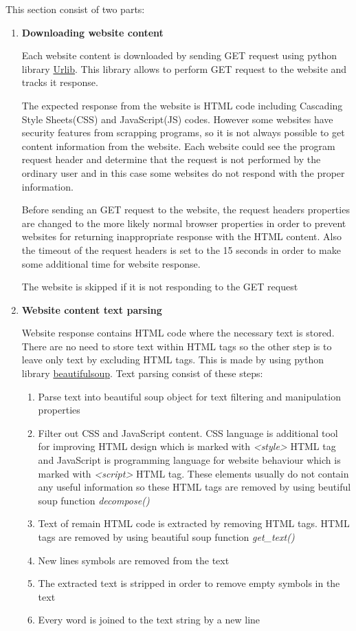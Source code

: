 This section consist of two parts:
\begin{enumerate}
    \item \textbf{Downloading website content}
    
    Each website content is downloaded by sending GET request using python library \href{https://docs.python.org/3/library/urllib.html}{Urlib}. This library allows to perform GET request to the website and tracks it response.
    
    The expected response from the website is HTML code including Cascading Style Sheets(CSS) and JavaScript(JS) codes. However some websites have security features from scrapping programs, so it is not always possible to get content information from the website. Each website could see the program request header and determine that the request is not performed by the ordinary user and in this case some websites do not respond with the proper information.
    
    Before sending an GET request to the website, the request headers properties are changed to the more likely normal browser properties in order to prevent websites for returning inappropriate response with the HTML content. Also the timeout of the request headers is set to the 15 seconds in order to make some additional time for website response. 
    
    The website is skipped if it is not responding to the GET request
    
    \item \textbf{Website content text parsing}
    
    Website response contains HTML code where the necessary text is stored. There are no need to store text within HTML tags so the other step is to leave only text by excluding HTML tags. This is made by using python library \href{https://pypi.org/project/beautifulsoup4/}{beautifulsoup}. Text parsing consist of these steps:
    \begin{enumerate}
        \item Parse text into beautiful soup object for text filtering and manipulation properties
        \item Filter out CSS and JavaScript content. CSS language is additional tool for improving HTML design which is marked with \textit{<style>} HTML tag and JavaScript is programming language for website behaviour which is marked with \textit{<script>} HTML tag. These elements usually do not contain any useful information so these HTML tags are removed by using beutiful soup function \textit{decompose()}
        \item Text of remain HTML code is extracted by removing HTML tags. HTML tags are removed by using beautiful soup function \textit{get\_text()}
        \item New lines symbols \textit{\n} are removed from the text
        \item The extracted text is stripped in order to remove empty symbols in the text
        \item Every word is joined to the text string by a new line
    \end{enumerate}
\end{enumerate}


